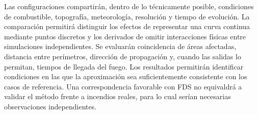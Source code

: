 Las configuraciones compartirán, dentro de lo técnicamente posible, condiciones de combustible, topografía, meteorología, resolución y tiempo de evolución. La comparación permitirá distinguir los efectos de representar una curva continua mediante puntos discretos y los derivados de omitir interacciones físicas entre simulaciones independientes. Se evaluarán coincidencia de áreas afectadas, distancia entre perímetros, dirección de propagación y, cuando las salidas lo permitan, tiempos de llegada del fuego. Los resultados permitirán identificar condiciones en las que la aproximación sea suficientemente consistente con los casos de referencia. Una correspondencia favorable con FDS no equivaldrá a validar el método frente a incendios reales, para lo cual serían necesarias observaciones independientes.